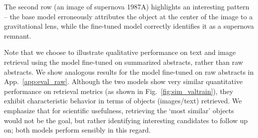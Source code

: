 \documentclass[10pt]{article} %
\begin{document}
The second row (an image of supernova 1987A) highlights an interesting pattern -- the base model erroneously attributes the object at the center of the image to a gravitational lens, while the fine-tuned model correctly identifies it as a supernova remnant.

Note that we choose to illustrate qualitative performance on text and image retrieval using the model fine-tuned on summarized abstracts, rather than raw abstracts. We show analogous results for the model fine-tuned on raw abstracts in App.~\ref{app:eval_raw}. Although the two models show very similar quantitative performance on retrieval metrics (as shown in Fig.~\ref{fig:sim_valtrain}), they exhibit characteristic behavior in terms of objects (images/text) retrieved. We emphasize that for scientific usefulness, retrieving the `most similar' objects would not be the goal, but rather identifying interesting candidates to follow up on; both models perform sensibly in this regard.
\end{document}
